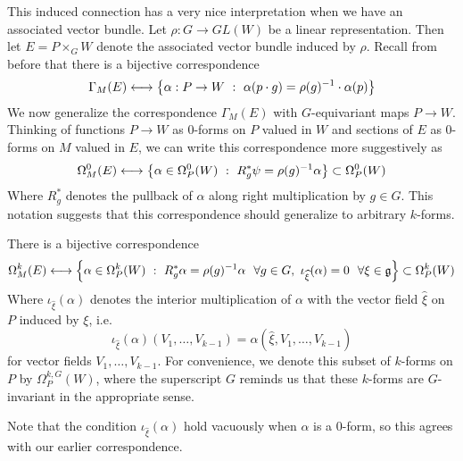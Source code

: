 This induced connection has a very nice interpretation when we have an associated
vector bundle. Let $\rho : G \to GL(W)$ be a linear representation. Then let
$E = P \times_G W$ denote the associated vector bundle induced by $\rho$.
Recall from before that there is a bijective correspondence
\[
\Gamma_M(E) \longleftrightarrow
\left\lbrace \alpha : P \to W ~:~ \alpha(p \cdot g) = \rho(g)^{-1} \cdot \alpha(p) \right\rbrace
\]
We now generalize the correspondence $\Gamma_M(E)$ with $G$-equivariant maps
$P \to W$. Thinking of functions $P \to W$ as $0$-forms on $P$ valued in $W$ and
sections of $E$ as $0$-forms on $M$ valued in $E$, we can write this
correspondence more suggestively as
\[
\Omega_M^0(E) \longleftrightarrow
\left\lbrace \alpha \in \Omega_P^0(W) ~:~ R_g^*\psi = \rho(g)^{-1}\alpha \right\rbrace \subset \Omega_P^0(W)
\]
Where $R_g^*$ denotes the pullback of $\alpha$ along right multiplication by
$g \in G$. This notation suggests that this correspondence should generalize
to arbitrary $k$-forms.
%
\begin{prop}
There is a bijective correspondence
\[
\Omega_M^k(E) \longleftrightarrow
\left\lbrace \alpha \in \Omega_P^k(W) ~:~ R_g^*\alpha = \rho(g)^{-1}\alpha ~~\forall g \in G,~
\iota_{\widehat{\xi}}(\alpha) = 0 ~~\forall \xi \in \mathfrak{g} \right\rbrace \subset \Omega_P^k(W)
\]
Where $\iota_{\widehat{\xi}}(\alpha)$  denotes the interior multiplication
of $\alpha$ with the vector field $\widehat{\xi}$ on $P$ induced by $\xi$, i.e.
\[
\iota_{\widehat{\xi}}(\alpha)(V_1, \ldots, V_{k-1}) =
\alpha(\widehat{\xi}, V_1, \ldots, V_{k-1})
\]
for vector fields $V_1, \ldots , V_{k-1}$. For convenience, we denote this
subset of $k$-forms on $P$ by $\Omega^{k,G}_P(W)$, where the superscript $G$
reminds us that these $k$-forms are $G$-invariant in the appropriate sense.
\end{prop}
%
\begin{rem*}
Note that the condition $\iota_{\widehat{\xi}}(\alpha)$ hold vacuously when
$\alpha$ is a $0$-form, so this agrees with our earlier correspondence.
\end{rem*}
%
